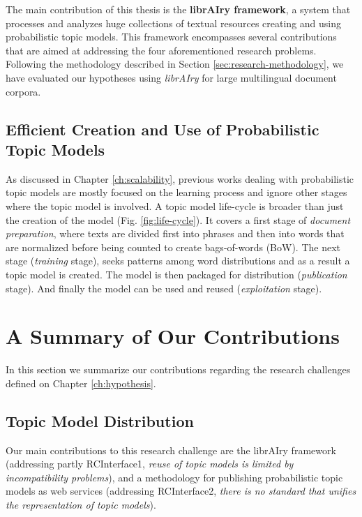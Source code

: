 The main contribution of this thesis is the \textbf{librAIry framework}, a system that processes and analyzes huge collections of textual resources creating and using probabilistic topic models. This framework encompasses several contributions that are aimed at addressing the four aforementioned research problems. Following the methodology described in Section \ref{sec:research-methodology}, we have evaluated our hypotheses using \textit{librAIry} for large multilingual document corpora. 

\subsection{Efficient Creation and Use of Probabilistic Topic Models}

As discussed in Chapter \ref{ch:scalability}, previous works dealing with probabilistic topic models are mostly focused on the learning process and ignore other stages where the topic model is involved. A topic model life-cycle is broader than just the creation of the model (Fig. \ref{fig:life-cycle}). It covers a first stage of \textit{document preparation}, where texts are divided first into phrases and then into words that are normalized before being counted to create bags-of-words (BoW). The next stage (\textit{training} stage),  seeks patterns among word distributions and as a result a topic model is created. The model is then packaged for distribution (\textit{publication} stage). And finally the model can be used and reused (\textit{exploitation} stage).

\section{A Summary of Our Contributions}

In this section we summarize our contributions regarding the research challenges defined on Chapter \ref{ch:hypothesis}.


\subsection{Topic Model Distribution}
Our main contributions to this research challenge are the librAIry framework (addressing partly RCInterface1, \textit{reuse of topic models is limited by incompatibility problems}), and a methodology for publishing probabilistic topic models as web services (addressing RCInterface2, \textit{there is no standard that unifies the representation of topic models}).

